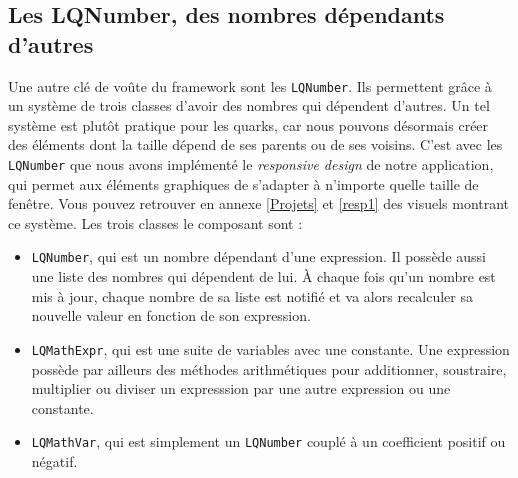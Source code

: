 \documentclass[twoside]{report}
\begin{document}
\begin{adjustbox}{pagecenter}
\end{adjustbox}

\subsection{Les LQNumber, des nombres dépendants d'autres}

Une autre clé de voûte du framework sont les \verb!LQNumber!. Ils permettent grâce à un système de trois classes d'avoir des nombres qui dépendent d'autres. Un tel système est plutôt pratique pour les quarks, car nous pouvons désormais créer des éléments dont la taille dépend de ses parents ou de ses voisins. C'est avec les \verb!LQNumber! que nous avons implémenté le \textit{responsive design} de notre application, qui permet aux éléments graphiques de s'adapter à n'importe quelle taille de fenêtre. Vous pouvez retrouver en annexe \ref{Projets} et \ref{resp1} des visuels montrant ce système. Les trois classes le composant sont :

\begin{itemize}[label=$-$, leftmargin=1.5cm]
    \setlength\itemsep{0em}
    \item \verb!LQNumber!, qui est un nombre dépendant d'une expression. Il possède aussi une liste des nombres qui dépendent de lui. À chaque fois qu'un nombre est mis à jour, chaque nombre de sa liste est notifié et va alors recalculer sa nouvelle valeur en fonction de son expression.
    \item \verb!LQMathExpr!, qui est une suite de variables avec une constante. Une expression possède par ailleurs des méthodes arithmétiques pour additionner, soustraire, multiplier ou diviser un expresssion par une autre expression ou une constante.
    \item \verb!LQMathVar!, qui est simplement un \verb!LQNumber! couplé à un coefficient positif ou négatif.
\end{itemize}
\end{document}
